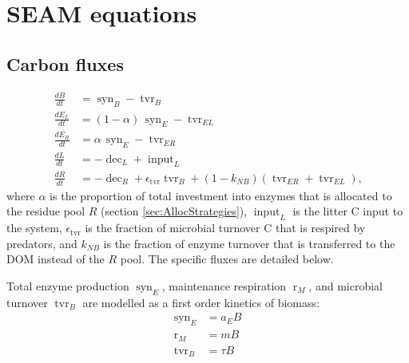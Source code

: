\section{SEAM equations \label{app:SEAM}}    

\subsection{Carbon fluxes}
\begin{subequations}
\label{eq:SEAM}
\begin{align}
\frac{dB}{dt} &= \operatorname{syn}_B - \operatorname{tvr}_B \\
\frac{dE_L}{dt} &= (1 - \alpha)  \, \operatorname{syn}_E -\operatorname{tvr}_{EL}\\
\frac{dE_R}{dt} &= \alpha \, \operatorname{syn}_E - \operatorname{tvr}_{ER} \\
\frac{dL}{dt} &=  - \operatorname{dec}_L + \operatorname{input}_L
\\
\frac{dR}{dt} &=  - \operatorname{dec}_R +
\epsilon_{\operatorname{tvr}}  \operatorname{tvr}_B + (1 -k_{NB})
(\operatorname{tvr}_{ER} + \operatorname{tvr}_{EL})
\text{,} 
\end{align}
\end{subequations}
where $\alpha$ is the proportion of total investment into enzymes
that is allocated to the residue pool $R$ (section
\ref{sec:AllocStrategies}), $\operatorname{input}_L$
is the litter C input to the system, $\epsilon_{\operatorname{tvr}}$ is the
fraction of microbial turnover C that is respired by predators, and $k_{NB}$ is the fraction of enzyme turnover
that is transferred to the DOM instead of the $R$ pool.
The specific fluxes are detailed below.

Total enzyme production $\operatorname{syn}_E$, maintenance respiration
$\operatorname{r}_{M}$, and microbial turnover $\operatorname{tvr}_B$ are
modelled as a first order kinetics of biomass:
\begin{subequations}
\begin{align}
\label{eq:synE} \operatorname{syn}_E &= a_E B \\
\label{eq:rM} \operatorname{r}_{M} &= m B \\
\label{eq:tvrB} \operatorname{tvr}_B &= \tau B 
\end{align}
\end{subequations}

